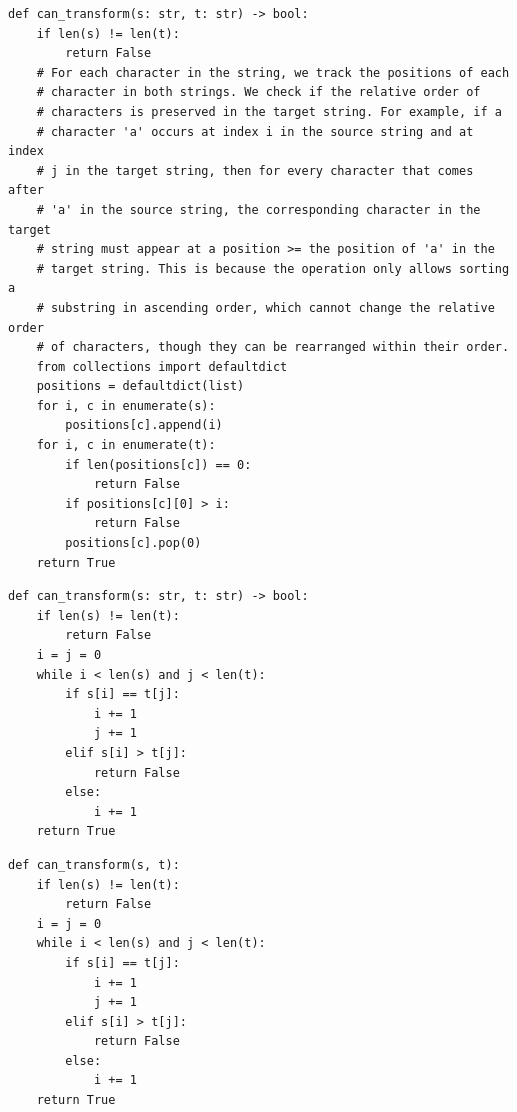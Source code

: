 \documentclass{article}
\begin{document}
\newsavebox{\boxneg}
\begin{lrbox}{\boxneg}\begin{minipage}{0.78\linewidth}\begin{lstlisting}[style=pyex]
def can_transform(s: str, t: str) -> bool:
    if len(s) != len(t):
        return False
    # For each character in the string, we track the positions of each
    # character in both strings. We check if the relative order of
    # characters is preserved in the target string. For example, if a
    # character 'a' occurs at index i in the source string and at index
    # j in the target string, then for every character that comes after
    # 'a' in the source string, the corresponding character in the target
    # string must appear at a position >= the position of 'a' in the
    # target string. This is because the operation only allows sorting a
    # substring in ascending order, which cannot change the relative order
    # of characters, though they can be rearranged within their order.
    from collections import defaultdict
    positions = defaultdict(list)
    for i, c in enumerate(s):
        positions[c].append(i)
    for i, c in enumerate(t):
        if len(positions[c]) == 0:
            return False
        if positions[c][0] > i:
            return False
        positions[c].pop(0)
    return True
\end{lstlisting}\end{minipage}\end{lrbox}

\newsavebox{\boxbase}
\begin{lrbox}{\boxbase}\begin{minipage}{0.78\linewidth}\begin{lstlisting}[style=pyex]
def can_transform(s: str, t: str) -> bool:
    if len(s) != len(t):
        return False
    i = j = 0
    while i < len(s) and j < len(t):
        if s[i] == t[j]:
            i += 1
            j += 1
        elif s[i] > t[j]:
            return False
        else:
            i += 1
    return True
\end{lstlisting}\end{minipage}\end{lrbox}

\newsavebox{\boxpos}
\begin{lrbox}{\boxpos}\begin{minipage}{0.78\linewidth}\begin{lstlisting}[style=pyex]
def can_transform(s, t):
    if len(s) != len(t):
        return False
    i = j = 0
    while i < len(s) and j < len(t):
        if s[i] == t[j]:
            i += 1
            j += 1
        elif s[i] > t[j]:
            return False
        else:
            i += 1
    return True
\end{lstlisting}\end{minipage}\end{lrbox}
\end{document}
